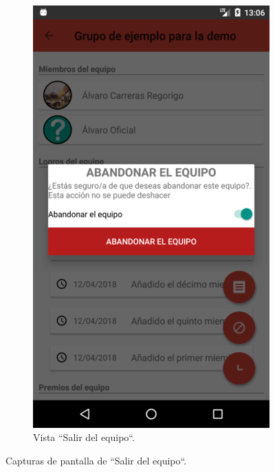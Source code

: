 \documentclass[twoside]{report}
\begin{document}
\begin{figure}[H]
\begin{center}
	\begin{subfigure}[t]{.3\linewidth}
		\includegraphics[scale=0.2]{images/userguide/22.png}
		\caption{Vista “Salir del equipo“.}
	\end{subfigure}\hspace{5mm}%
\caption{Capturas de pantalla de “Salir del equipo“.}
\end{center}
\end{figure}
\end{document}
